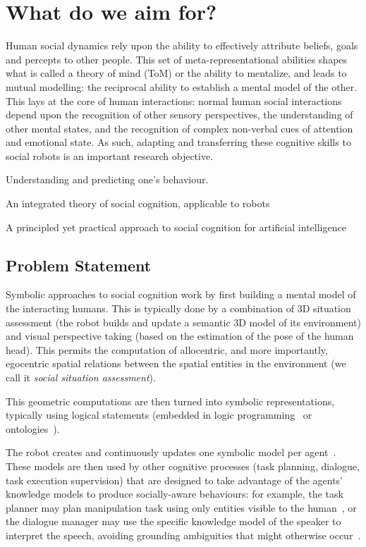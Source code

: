 \documentclass[a4paper]{article}
\begin{document}
\section{What do we aim for?}

Human social dynamics rely upon the ability to effectively attribute beliefs,
goals and percepts to other people. This set of meta-representational abilities
shapes what is called a theory of mind (ToM) or the ability to mentalize, and
leads to mutual modelling: the reciprocal ability to establish a mental model of
the other. This lays at the core of human interactions: normal human social
interactions depend upon the recognition of other sensory perspectives, the
understanding of other mental states, and the recognition of complex non-verbal
cues of attention and emotional state. As such, adapting and transferring these
cognitive skills to social robots is an important research objective.


Understanding and predicting one's behaviour.

An integrated theory of social cognition, applicable to robots

A principled yet practical approach to social cognition for artificial intelligence


\subsection{Problem Statement}


Symbolic approaches to social cognition work by first building a mental model of the
interacting humans. This is typically done by a combination of 3D situation
assessment (the robot builds and update a semantic 3D model of its environment)
and visual perspective taking (based on the estimation of the pose of the human
head). This permits the computation of allocentric, and more importantly,
egocentric spatial relations between the spatial entities in the environment
(we call it \emph{social situation assessment}).

This geometric computations are then turned into symbolic representations,
typically using logical statements (embedded in logic
programming~\cite{tenorth2009knowrob} or ontologies~\cite{lemaignan2010oro}).

The robot creates and continuously updates one symbolic model per
agent~\cite{lemaignan2010oro}. These models are then used by other cognitive
processes (task planning, dialogue, task execution supervision) that are
designed to take advantage of the agents' knowledge models to produce
socially-aware behaviours: for example, the task planner may plan manipulation
task using only entities visible to the human~\cite{lallement2014hatp}, or the
dialogue manager may use the specific knowledge model of the speaker to
interpret the speech, avoiding grounding ambiguities that might otherwise
occur~\cite{lemaignan2011grounding}.
\end{document}
